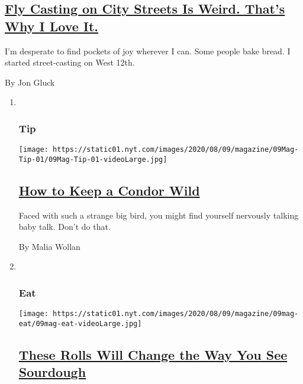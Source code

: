 \begin{enumerate}
{  \subsection{\texorpdfstring{\href{/2020/08/05/magazine/fly-casting-on-city-streets-is-weird-thats-why-i-love-it.html}{Fly
  Casting on City Streets Is Weird. That's Why I Love
  It.}}{Fly Casting on City Streets Is Weird. That's Why I Love It.}}\label{fly-casting-on-city-streets-is-weird-thats-why-i-love-it}}

  I'm desperate to find pockets of joy wherever I can. Some people bake
  bread. I started street-casting on West 12th.

  By Jon Gluck
\end{enumerate}

\begin{enumerate}
\def\labelenumi{\arabic{enumi}.}
\item ~
  \hypertarget{tip}{%
  \subsubsection{Tip}\label{tip}}

  \texttt{[image: https://static01.nyt.com/images/2020/08/09/magazine/09Mag-Tip-01/09Mag-Tip-01-videoLarge.jpg]}

  \hypertarget{how-to-keep-a-condor-wild}{%
  \subsection{\texorpdfstring{\href{/2020/08/04/magazine/condors-yurok-tribe.html}{How
  to Keep a Condor
  Wild}}{How to Keep a Condor Wild}}\label{how-to-keep-a-condor-wild}}

  Faced with such a strange big bird, you might find yourself nervously
  talking baby talk. Don't do that.

  By Malia Wollan
\item ~
  \hypertarget{eat}{%
  \subsubsection{Eat}\label{eat}}

  \texttt{[image: https://static01.nyt.com/images/2020/08/09/magazine/09mag-eat/09mag-eat-videoLarge.jpg]}

  \hypertarget{these-rolls-will-change-the-way-you-see-sourdough}{%
  \subsection{\texorpdfstring{\href{/2020/08/05/magazine/pan-de-coco-recipe-bryan-ford.html}{These
  Rolls Will Change the Way You See
  Sourdough}}{These Rolls Will Change the Way You See Sourdough}}\label{these-rolls-will-change-the-way-you-see-sourdough}}


\end{enumerate}
